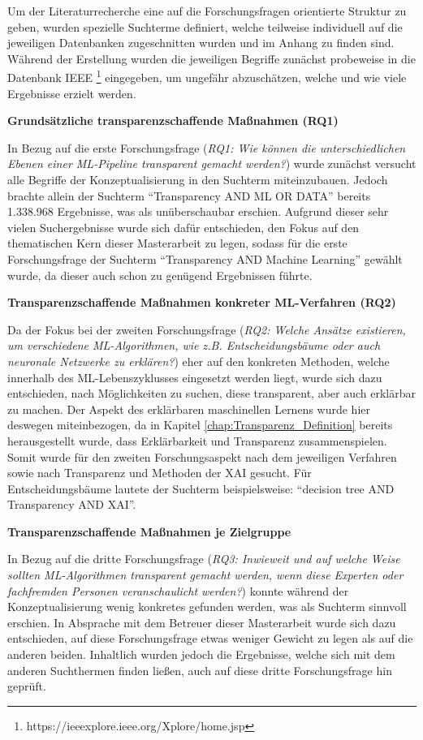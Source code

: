 Um der Literaturrecherche eine auf die Forschungsfragen orientierte Struktur zu geben, wurden spezielle Suchterme definiert, welche teilweise individuell auf die jeweiligen Datenbanken zugeschnitten wurden und im Anhang zu finden sind. Während der Erstellung wurden die jeweiligen Begriffe zunächst probeweise in die Datenbank IEEE \footnote{https://ieeexplore.ieee.org/Xplore/home.jsp} eingegeben, um ungefähr abzuschätzen, welche und wie viele Ergebnisse erzielt werden. 

\textbf{Grundsätzliche transparenzschaffende Maßnahmen (RQ1)}
\begin{addmargin}[25pt]{0pt}
In Bezug auf die erste Forschungsfrage (\textit{RQ1: Wie können die unterschiedlichen Ebenen einer ML-Pipeline transparent gemacht werden?}) wurde zunächst versucht alle Begriffe der Konzeptualisierung in den Suchterm miteinzubauen. Jedoch brachte allein der Suchterm \enquote{Transparency AND ML OR DATA} bereits 1.338.968 Ergebnisse, was als unüberschaubar erschien. Aufgrund dieser sehr vielen Suchergebnisse wurde sich dafür entschieden, den Fokus auf den thematischen Kern dieser Masterarbeit zu legen, sodass für die erste Forschungsfrage der Suchterm \enquote{Transparency AND Machine Learning} gewählt wurde, da dieser auch schon zu genügend Ergebnissen führte.
\end{addmargin}

\textbf{Transparenzschaffende Maßnahmen konkreter ML-Verfahren (RQ2)}
\begin{addmargin}[25pt]{0pt}
Da der Fokus bei der zweiten Forschungsfrage (\textit{RQ2: Welche Ansätze existieren, um verschiedene ML-Algorithmen, wie z.B. Entscheidungsbäume oder auch neuronale Netzwerke zu erklären?}) eher auf den konkreten Methoden, welche innerhalb des ML-Lebenszyklusses eingesetzt werden liegt, wurde sich dazu entschieden, nach Möglichkeiten zu suchen, diese transparent, aber auch erklärbar zu machen. Der Aspekt des erklärbaren maschinellen Lernens wurde hier deswegen miteinbezogen, da in Kapitel \ref{chap:Transparenz_Definition} bereits herausgestellt wurde, dass Erklärbarkeit und Transparenz zusammenspielen. Somit wurde für den zweiten Forschungsaspekt nach dem jeweiligen Verfahren sowie nach Transparenz und Methoden der XAI gesucht. Für Entscheidungsbäume lautete der Suchterm beispielsweise: \enquote{decision tree AND Transparency AND XAI}.
\end{addmargin}

\textbf{Transparenzschaffende Maßnahmen je Zielgruppe}
\begin{addmargin}[25pt]{0pt}
In Bezug auf die dritte Forschungsfrage (\textit{RQ3: Inwieweit und auf welche Weise sollten ML-Algorithmen transparent gemacht werden, wenn diese Experten oder fachfremden Personen veranschaulicht werden?}) konnte während der Konzeptualisierung wenig konkretes gefunden werden, was als Suchterm sinnvoll erschien. In Absprache mit dem Betreuer dieser Masterarbeit wurde sich dazu entschieden, auf diese Forschungsfrage etwas weniger Gewicht zu legen als auf die anderen beiden. Inhaltlich wurden jedoch die Ergebnisse, welche sich mit dem anderen Suchthermen finden ließen, auch auf diese dritte Forschungsfrage hin geprüft.
\end{addmargin}